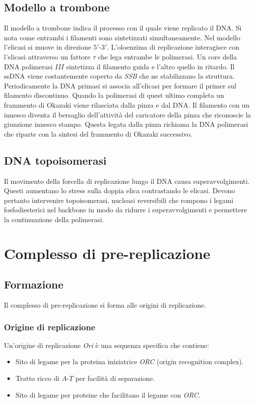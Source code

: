 	\subsection{Modello a trombone}
	Il modello a trombone indica il processo con il quale viene replicato il DNA.
	Si nota come entrambi i filamenti sono sintetizzati simultaneamente.
	Nel modello l'elicasi si muove in direzione $5'$-$3'$.
	L'oloenzima di replicazione interagisce con l'elicasi attraverso un fattore $\tau$ che lega entrambe le polimerasi.
	Un core della DNA polimerasi $III$ sintetizza il filamento guida e l'altro quello in ritardo.
	Il ssDNA viene costantemente coperto da \emph{SSB} che ne stabilizzano la struttura.
	Periodicamente la DNA primasi si associa all'elicasi per formare il primer sul filamento discontinuo.
	Quando la polimerasi di quest ultimo completa un frammento di Okazaki viene rilasciata dalla pinza e dal DNA.
	Il filamento con un innesco diventa il bersaglio dell'attivit\`a del caricatore della pinza che riconoscie la giunzione innesco stampo.
	Questa legata dalla pinza richiama la DNA polimerasi che riparte con la sintesi del frammento di Okazaki successivo.

	\subsection{DNA topoisomerasi}
	Il movimento della forcella di replicazione lungo il DNA causa superavvolgimenti.
	Questi aumentano lo stress sulla doppia elica contrastando le elicasi.
	Devono pertanto intervenire topoisomerasi, nucleasi reversibili che rompono i legami fosfodiesterici nel backbone in modo da ridurre i superavvolgimenti e permettere la continuazione della polimerasi.

\section{Complesso di pre-replicazione}

	\subsection{Formazione}
	Il complesso di pre-replicazione si forma alle origini di replicazione.

		\subsubsection{Origine di replicazione}
		Un'origine di replicazione \emph{Ori} \`e una sequenza specifica che contiene:
		\begin{multicols}{2}
			\begin{itemize}
				\item Sito di legame per la proteina iniziatrice \emph{ORC} (origin recognition complex).
				\item Tratto ricco di $A$-$T$ per facilit\`a di separazione.
				\item Sito di legame per proteine che facilitano il legame con \emph{ORC}.
			\end{itemize}
		\end{multicols}

